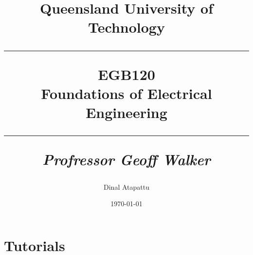 \documentclass[oneside]{book}
\begin{document}
\pagestyle{fancy}
    \fancyhf{}
\fancyhead[R]{\nouppercase{\leftmark}}
\renewcommand{\footrulewidth}{0.4pt}
    \title{
            Queensland University of Technology\\
            \rule{\linewidth}{0.5pt}
        \centering
        \textbf{EGB120} \\
        Foundations of Electrical Engineering\\
        \vspace{0.4cm}
        \rule{\linewidth}{1.5pt}
        \small{\textit{Profressor Geoff Walker}}
    }
    \author{Dinal Atapattu}
    \date{\today}
    \maketitle
    \thispagestyle{empty}
    \tableofcontents
        
        
        
        
        
        
        
        
        
        
        
        
        
        \chapter{Tutorials}
            
\end{document}

